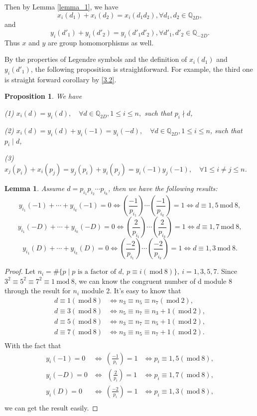 \documentclass{amsart}
\numberwithin{equation}{section}
\theoremstyle{plain}
\newtheorem{lemma_}[equation]{Lemma}
\newtheorem{prop_}[equation]{Proposition}
\theoremstyle{definition}
\newcommand{\lemm}[1]{\begin{lemma_}#1\end{lemma_}}
\newcommand{\prop}[1]{\begin{prop_}#1\end{prop_}}
\newcommand{\pf}[1]{\begin{proof}#1\end{proof}}
\newcommand{\QQ}{\mathbb Q}
\renewcommand{\mod}[1]{\ \mathrm{mod}\ #1}  %
\begin{document}
Then by Lemma \ref{lemma_1}, we have
$$x_{i}(d_1) + x_{i}(d_2) = x_{i}(d_1d_2),  \forall d_1,d_2 \in \mathbb{Q}_{2D},$$
and
$$y_{i}(d'_1)+ y_{i}(d'_2) = y_{i}(d'_1d'_2),  \forall d'_1,d'_2 \in \mathbb{Q}_{-2D}.$$
Thus $x$ and $y$ are group homomorphisms as well.

By the properties of Legendre symbols and the definition of $x_{i}(d_1)$ and $y_{i}(d'_1)$, the following proposition is straightforward. For example, the third one is straight forward corollary by \ref{3.2}.
\prop{\label{prop1} We have

(1) $x_{i}(d) = y_{i}(d),\quad \forall d \in \QQ_{2D}, 1 \leq i \leq n,$ such that $ p_i \nmid d$,

(2) $x_{i}(d) = y_{i}(d) + y_{i}(-1) =  y_{i}(-d),\quad \forall d \in \QQ_{2D}, 1 \leq i \leq n$, such that $p_i \mid d$,

(3) $x_{j}(p_i) + x_{i}(p_j) = y_{j}(p_i) + y_{i}(p_j) =y_{i}(-1)y_{j}(-1) ,\quad \forall 1 \leq i \neq j \leq n$.
}

\lemm{\label{lemma_2} Assume  $d = p_{i_1}p_{i_2} \cdots p_{i_k}$, then we have the following results:
$$ y_{i_1}(-1)+ \cdots + y_{i_k}(-1) = 0 \Leftrightarrow (\frac{-1}{p_{i_1}})\cdots (\frac{-1}{p_{i_k}}) = 1 \Leftrightarrow d \equiv 1,5 \mod 8,$$
$$y_{i_1}(-D)+ \cdots + y_{i_k}(-D) = 0 \Leftrightarrow (\frac{2}{p_{i_1}})\cdots (\frac{2}{p_{i_k}}) = 1 \Leftrightarrow d \equiv 1,7 \mod 8,$$
$$y_{i_1}(D)+ \cdots + y_{i_k}(D) = 0 \Leftrightarrow (\frac{-2}{p_{i_1}})\cdots (\frac{-2}{p_{i_k}})= 1 \Leftrightarrow d \equiv 1,3 \mod 8.$$
}




\pf{ Let $n_{i} = \# \{ p \mid p \text{ is a factor of } d,\  p \equiv i (\mod 8)\},\  i = 1,3,5,7$. Since $3^2 \equiv 5^2 \equiv 7^2 \equiv 1 \mod 8$, we can know the congruent number of d module 8 through the result for  $n_i$ module 2.
It's easy to know that
$$
\begin{aligned}
d \equiv 1 (\mod 8) & \Leftrightarrow n_3  \equiv n_5 \equiv n_7 (\mod 2), \\
d \equiv 3 (\mod 8) & \Leftrightarrow n_5 \equiv n_7 \equiv n_3+1(\mod 2), \\
d \equiv 5 (\mod 8) & \Leftrightarrow n_3 \equiv n_7 \equiv n_5+1 (\mod 2), \\
d \equiv 7 (\mod 8) & \Leftrightarrow n_3 \equiv n_5 \equiv n_7 +1(\mod 2). \\
\end{aligned}
$$
With the fact that
$$
\begin{aligned}
y_{i}(-1) = 0   &\Leftrightarrow \ (\frac{-1}{p_i}) = 1 &\Leftrightarrow p_i \equiv 1,5 (\mod 8), \\
y_{i}(-D) = 0   &\Leftrightarrow\ \ (\frac{2}{p_i}) = 1 &\Leftrightarrow p_i \equiv 1,7 (\mod 8), \\
y_{i}(D) = 0   &\Leftrightarrow\ (\frac{-2}{p_i}) = 1 &\Leftrightarrow p_i \equiv 1,3 (\mod 8),  \\
\end{aligned}
$$
we can get the result easily.
}
\end{document}
